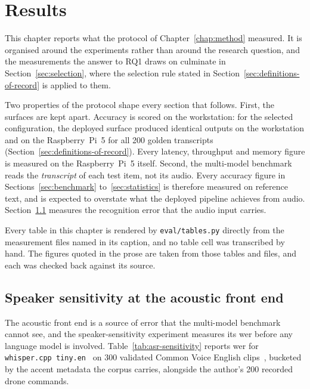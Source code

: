 \chapter{Results}
\label{chap:results}

This chapter reports what the protocol of Chapter~\ref{chap:method} measured. It is organised
around the experiments rather than around the research question, and the measurements the answer
to RQ1 draws on culminate in Section~\ref{sec:selection}, where the selection rule stated in
Section~\ref{sec:definitions-of-record} is applied to them.

Two properties of the protocol shape every section that follows. First, the surfaces are kept
apart. Accuracy is scored on the workstation: for the selected configuration, the deployed surface
produced identical outputs on the workstation and on the Raspberry~Pi~5 for all 200 golden
transcripts (Section~\ref{sec:definitions-of-record}). Every latency, throughput and memory figure
is measured on the Raspberry~Pi~5 itself. Second, the multi-model benchmark reads the
\emph{transcript} of each test item, not its audio. Every accuracy figure in
Sections~\ref{sec:benchmark} to~\ref{sec:statistics} is therefore measured on reference text, and
is expected to overstate what the deployed pipeline achieves from audio.
Section~\ref{sec:speaker-sensitivity} measures the recognition error that the audio input carries.

Every table in this chapter is rendered by \texttt{eval/tables.py} directly from the measurement
files named in its caption, and no table cell was transcribed by hand. The figures quoted in the
prose are taken from those tables and files, and each was checked back against its source.

\section{Speaker sensitivity at the acoustic front end}
\label{sec:speaker-sensitivity}

The acoustic front end is a source of error that the multi-model benchmark cannot see, and the
speaker-sensitivity experiment measures its \gls{wer} before any language model is involved.
Table~\ref{tab:asr-sensitivity} reports \gls{wer} for \texttt{whisper.cpp tiny.en}~\cite{whisper,whispercpp}
on 300 validated Common Voice English clips~\cite{commonvoice}, bucketed by the accent metadata the
corpus carries, alongside the author's 200 recorded drone commands.

